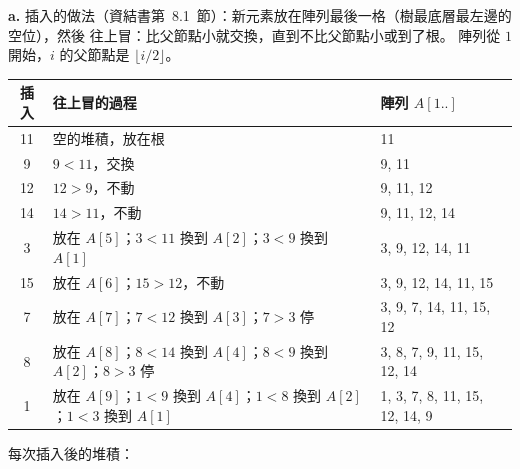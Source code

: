 \begin{pastsoln}
\textbf{a.} 插入的做法（資結書第~8.1~節）：新元素放在陣列最後一格（樹最底層最左邊的空位），然後
往上冒：比父節點小就交換，直到不比父節點小或到了根。 陣列從 $1$ 開始，$i$ 的父節點是
$\lfloor i/2 \rfloor$。

\begin{center}
\small
\begin{tabular}{cll}
\toprule
插入 & 往上冒的過程 & 陣列 $A[1..]$ \\
\midrule
11 & 空的堆積，放在根 & 11 \\
9 & $9 < 11$，交換 & 9, 11 \\
12 & $12 > 9$，不動 & 9, 11, 12 \\
14 & $14 > 11$，不動 & 9, 11, 12, 14 \\
3 & 放在 $A[5]$；$3 < 11$ 換到 $A[2]$；$3 < 9$ 換到 $A[1]$ & 3, 9, 12, 14, 11 \\
15 & 放在 $A[6]$；$15 > 12$，不動 & 3, 9, 12, 14, 11, 15 \\
7 & 放在 $A[7]$；$7 < 12$ 換到 $A[3]$；$7 > 3$ 停 & 3, 9, 7, 14, 11, 15, 12 \\
8 & 放在 $A[8]$；$8 < 14$ 換到 $A[4]$；$8 < 9$ 換到 $A[2]$；$8 > 3$ 停 & 3, 8, 7, 9, 11, 15, 12, 14 \\
1 & 放在 $A[9]$；$1 < 9$ 換到 $A[4]$；$1 < 8$ 換到 $A[2]$；$1 < 3$ 換到 $A[1]$ & 1, 3, 7, 8, 11, 15, 12, 14, 9 \\
\bottomrule
\end{tabular}
\end{center}

每次插入後的堆積：


\end{pastsoln}
